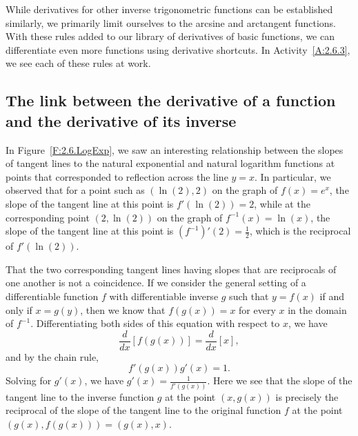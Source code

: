 While derivatives for other inverse trigonometric functions can be established similarly, we primarily limit ourselves to the arcsine and arctangent functions.  With these rules added to our library of derivatives of basic functions, we can differentiate even more functions using derivative shortcuts.  In Activity~\ref{A:2.6.3}, we see each of these rules at work.



\subsection*{The link between the derivative of a function and the derivative of its inverse}

In Figure~\ref{F:2.6.LogExp}, we saw an interesting relationship between the slopes of tangent lines to the natural exponential and natural logarithm functions at points that corresponded to reflection across the line $y = x$.  In particular, we observed that for a point such as $(\ln(2), 2)$ on the graph of $f(x) = e^x$, the slope of the tangent line at this point is $f'(\ln(2)) = 2$, while at the corresponding point $(2, \ln(2))$ on the graph of $f^{-1}(x) = \ln(x)$, the slope of the tangent line at this point is $(f^{-1})'(2) = \frac{1}{2}$, which is the reciprocal of $f'(\ln(2))$.

That the two corresponding tangent lines having slopes that are reciprocals of one another is not a coincidence.  If we consider the general setting of a differentiable function $f$ with differentiable inverse $g$ such that $y = f(x)$ if and only if $x = g(y)$, then we know that $f(g(x)) = x$ for every $x$ in the domain of $f^{-1}$.  Differentiating both sides of this equation with respect to $x$, we have
$$\frac{d}{dx} [f(g(x))] = \frac{d}{dx} [x],$$
and by the chain rule,
$$f'(g(x)) g'(x) = 1.$$
Solving for $g'(x)$, we have $g'(x) = \frac{1}{f'(g(x))}.$  Here we see that the slope of the tangent line to the inverse function $g$ at the point $(x,g(x))$ is precisely the reciprocal of the slope of the tangent line to the original function $f$ at the point $(g(x),f(g(x))) = (g(x),x)$.

